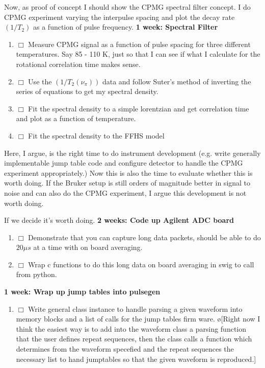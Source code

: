 \documentclass[10pt]{book}
\begin{document}
Now, as proof of concept I should show the CPMG spectral filter concept. I do CPMG experiment varying the interpulse spacing and plot the decay rate $(1/T_2)$ as a function of pulse frequency.
{\bf 1 week: Spectral Filter}
\begin{enumerate}
    \item $\Box$ Measure CPMG signal as a function of pulse spacing for three different temperatures. Say 85 - 110 K, just so that I can see if what I calculate for the rotational correlation time makes sense.
    \item $\Box$ Use the $(1/T_2(\nu_{\pi}))$ data and follow Suter's method of inverting the series of equations to get my spectral density.
    \item $\Box$ Fit the spectral density to a simple lorentzian and get correlation time and plot as a function of temperature.
    \item $\Box$ Fit the spectral density to the FFHS model\\
\end{enumerate}

Here, I argue, is the right time to do instrument development (e.g. write generally implementable jump table code and configure detector to handle the CPMG experiment appropriately.) Now this is also the time to evaluate whether this is worth doing. If the Bruker setup is still orders of magnitude better in signal to noise and can also do the CPMG experiment, I argue this development is not worth doing.

If we decide it's worth doing.
{\bf 2 weeks: Code up Agilent ADC board}
\begin{enumerate}
    \item $\Box$ Demonstrate that you can capture long data packets, should be able to do $20 \mu s$ at a time with on board averaging.
    \item $\Box$ Wrap c functions to do this long data on board averaging in swig to call from python.\\
\end{enumerate}

{\bf 1 week: Wrap up jump tables into pulsegen}
\begin{enumerate}
    \item $\Box$ Write general class instance to handle parsing a given waveform into memory blocks and a list of calls for the jump tables firm ware. \o[Right now I think the easiest way is to add into the waveform class a parsing function that the user defines repeat sequences, then the class calls a function which determines from the waveform specefied and the repeat sequences the necessary list to hand jumptables so that the given waveform is reproduced.]{}\\
\end{enumerate}
\end{document}
